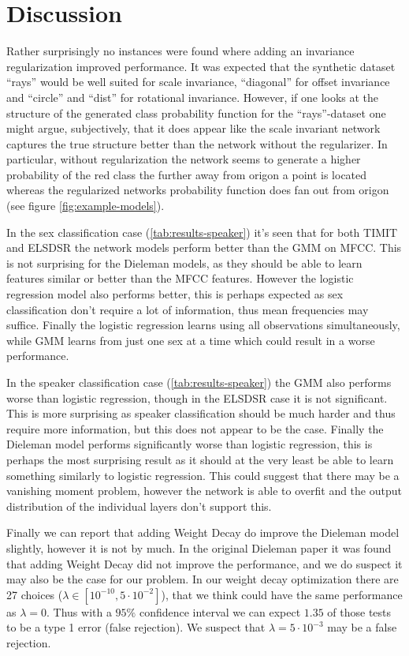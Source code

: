\section{Discussion}
Rather surprisingly no instances were found where adding an invariance regularization improved performance. It was expected that the synthetic dataset ``rays'' would be well suited for scale invariance, ``diagonal'' for offset invariance and ``circle'' and ``dist'' for rotational invariance. However, if one looks at the structure of the generated class probability function for the ``rays''-dataset one might argue, subjectively, that it does appear like the scale invariant network captures the true structure better than the network without the regularizer. In particular, without regularization the network seems to generate a higher probability of the red class the further away from origon a point is located whereas  the regularized networks probability function does fan out from origon (see figure \ref{fig:example-models}).

In the sex classification case (\cref{tab:results-speaker}) it's seen that for both TIMIT and ELSDSR the network models perform better than the GMM on MFCC. This is not surprising for the Dieleman models, as they should be able to learn features similar or better than the MFCC features. However the logistic regression model also performs better, this is perhaps expected as sex classification don't require a lot of information, thus mean frequencies may suffice. Finally the logistic regression learns using all observations simultaneously, while GMM learns from just one sex at a time which could result in a worse performance.

In the speaker classification case (\cref{tab:results-speaker}) the GMM also performs worse than logistic regression, though in the ELSDSR case it is not significant. This is more surprising as speaker classification should be much harder and thus require more information, but this does not appear to be the case. Finally the Dieleman model performs significantly worse than logistic regression, this is perhaps the most surprising result as it should at the very least be able to learn something similarly to logistic regression. This could suggest that there may be a vanishing moment problem, however the network is able to overfit and the output distribution of the individual layers don't support this.

Finally we can report that adding Weight Decay do improve the Dieleman model slightly, however it is not by much. In the original Dieleman paper \cite{dieleman} it was found that adding Weight Decay did not improve the performance, and we do suspect it may also be the case for our problem. In our weight decay optimization there are 27 choices ($\lambda \in [10^{-10}, 5 \cdot 10^{-2}]$), that we think could have the same performance as $\lambda = 0$. Thus with a $95\%$ confidence interval we can expect $1.35$ of those tests to be a type 1 error (false rejection). We suspect that $\lambda = 5 \cdot 10^{-3}$ may be a false rejection.

